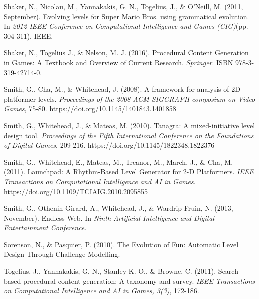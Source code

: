 \begin{thebibliography}{9}
Shaker, N., Nicolau, M., Yannakakis, G. N., Togelius, J., \& O'Neill, M. (2011, September). Evolving levels for Super Mario Bros. using grammatical evolution. In \emph{2012 IEEE Conference on Computational Intelligence and Games (CIG)}(pp. 304-311). IEEE.

Shaker, N., Togelius J., \& Nelson, M. J. (2016). Procedural Content Generation in Games: A Textbook and Overview of Current Research. \emph{Springer}. ISBN 978-3-319-42714-0.

Smith, G., Cha, M., \& Whitehead, J. (2008). A framework for analysis of 2D platformer levels. \emph{Proceedings of the 2008 ACM SIGGRAPH composium on Video Games}, 75-80. https://doi.org/10.1145/1401843.1401858

Smith, G., Whitehead, J., \& Mateas, M. (2010). Tanagra: A mixed-initiative level design tool. \emph{Proceedings of the Fifth International Conference on the Foundations of Digital Games}, 209-216. https://doi.org/10.1145/1822348.1822376

Smith, G., Whitehead, E., Mateas, M., Treanor, M., March, J., \& Cha, M. (2011). Launchpad: A Rhythm-Based Level Generator for 2-D Platformers. \emph{IEEE Transactions on Computational Intelligence and AI in Games}. https://doi.org/10.1109/TCIAIG.2010.2095855

Smith, G., Othenin-Girard, A., Whitehead, J., \& Wardrip-Fruin, N. (2013, November). Endless Web. In \emph{Ninth Artificial Intelligence and Digital Entertainment Conference}.

Sorenson, N., \& Pasquier, P. (2010). The Evolution of Fun: Automatic Level Design Through Challenge Modelling.

Togelius, J., Yannakakis, G. N., Stanley K. O., \& Browne, C. (2011). Search-based procedural content generation: A taxonomy and survey. \emph{IEEE Transactions on Computational Intelligence and AI in Games, 3(3)}, 172-186.

\end{thebibliography}